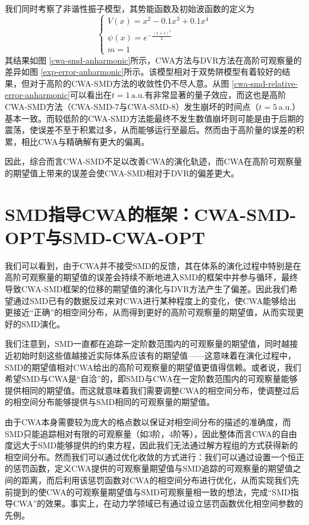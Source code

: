 我们同时考察了非谐性振子模型，其势能函数及初始波函数的定义为\cite{liu2007real}
\begin{equation}
\begin{cases}
V(x) = x^2 - 0.1 x^3 + 0.1 x^4 \\
\psi(x) = e^{-\frac{(x+1)^2}{2}} \\
m = 1
\end{cases}
\end{equation}
其结果如图 \ref{cwa-smd-anharmonic}所示，CWA方法与DVR方法在高阶可观察量的差异如图 \ref{exp-error-anharmonic}所示。该模型相对于双势阱模型有着较好的结果，但对于高阶的CWA-SMD方法的收敛性仍不尽人意。从图 \ref{cwa-smd-relative-error-anharmonic}可以看出在$t= 1 \, \mathrm{a.u.}$有非常显著的量子效应，而这也是高阶CWA-SMD方法（CWA-SMD-7与CWA-SMD-8）发生崩坏的时间点（$t= 5 \, \mathrm{a.u.}$）基本一致。而较低阶的CWA-SMD方法能最终不发生数值崩坏则可能是由于后期的震荡，使误差不至于积累过多，从而能够运行至最后。然而由于高阶量的误差的积累，相比CWA与精确解有更大的偏离。

因此，综合而言CWA-SMD不足以改善CWA的演化轨迹，而CWA在高阶可观察量的期望值上带来的误差会使CWA-SMD相对于DVR的偏差更大。

\newpage
\section{SMD指导CWA的框架：CWA-SMD-OPT与SMD-CWA-OPT}
我们可以看到，由于CWA并不接受SMD的反馈，其在体系的演化过程中特别是在高阶可观察量的期望值的误差会持续不断地进入SMD的框架中并参与循环，最终导致CWA-SMD框架的位移的期望值的演化与DVR方法产生了偏差。因此我们希望通过SMD已有的数据反过来对CWA进行某种程度上的变化，使CWA能够给出更接近``正确''的相空间分布，从而得到更好的高阶可观察量的期望值，从而实现更好的SMD演化。

我们注意到，SMD一直都在追踪一定阶数范围内的可观察量的期望值，同时越接近初始时刻这些值越接近实际体系应该有的期望值——这意味着在演化过程中，SMD的期望值相对CWA给出的高阶可观察量的期望值更值得信赖。或者说，我们希望SMD与CWA是``自洽''的，即SMD与CWA在一定阶数范围内的可观察量能够提供相同的期望值。而这就意味着我们需要调整CWA的相空间分布，使调整过后的相空间分布能够提供与SMD相同的可观察量的期望值。

由于CWA本身需要较为庞大的格点数以保证对相空间分布的描述的准确度，而SMD只能追踪相对有限的可观察量（如3阶，4阶等），因此整体而言CWA的自由度远大于SMD能够提供的约束方程，因此我们无法通过解方程组的方式获得新的相空间分布。然而我们可以通过优化收敛的方式进行：我们可以通过设置一个恒正的惩罚函数，定义CWA提供的可观察量期望值与SMD追踪的可观察量的期望值之间的距离，而后利用该惩罚函数对CWA的相空间分布进行优化，从而实现我们先前提到的使CWA的可观察量期望值与SMD可观察量相一致的想法，完成``SMD指导CWA''的效果。事实上，在动力学领域已有通过设立惩罚函数优化相空间参数的先例。

